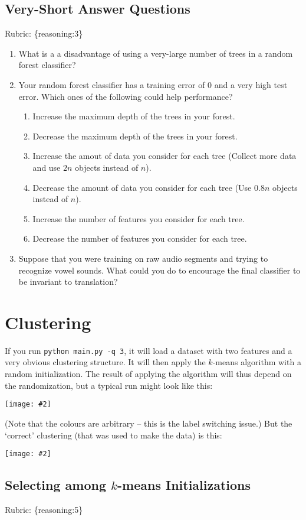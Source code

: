 \documentclass{article}
\def\blu#1{{\color{blu}#1}}
\def\gre#1{{\color{gre}#1}}
\newcommand{\centerfig}[2]{\begin{center}\texttt{[image: \#2]}\end{center}}
\def\enum#1{\begin{enumerate}#1\end{enumerate}}
\def\rubric#1{\gre{Rubric: \{#1\}}}{}
\begin{document}
\subsection{Very-Short Answer Questions}
\rubric{reasoning:3}

\blu{\enum{
\item What is a a disadvantage of using a very-large number of trees in a random forest classifier?
\item Your random forest classifier has a training error of 0 and a very high test error. Which ones of the following could help performance?
\enum{
\item Increase the maximum depth of the trees in your forest.
\item Decrease the maximum depth of the trees in your forest.
\item Increase the amout of data you consider for each tree (Collect more data and use $2n$ objects instead of $n$).
\item Decrease the amount of data you consider for each tree (Use $0.8n$ objects instead of $n$).
\item Increase the number of features you consider for each tree.
\item Decrease the number of features you consider for each tree.
}
\item Suppose that you were training on raw audio segments and trying to recognize vowel sounds. What could you do to encourage the final classifier to be invariant to translation?
}
}

\section{Clustering}

If you run \verb|python main.py -q 3|, it will load a dataset with two features
and a very obvious clustering structure. It will then apply the $k$-means algorithm
with a random initialization. The result of applying the
algorithm will thus depend on the randomization, but a typical run might look like this:
\centerfig{.5}{../figs/kmeans_basic.png}
(Note that the colours are arbitrary -- this is the label switching issue.)
But the `correct' clustering (that was used to make the data) is this:
\centerfig{.5}{../figs/kmeans_good.png}


\subsection{Selecting among $k$-means Initializations}
\rubric{reasoning:5}
\end{document}
